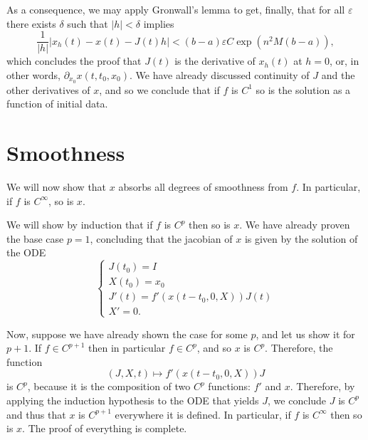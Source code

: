 \documentclass{article}
\begin{document}
As a consequence, we may apply Gronwall's lemma to get, finally, that for all $\varepsilon$ there exists $\delta$ such that $\lvert h \rvert < \delta$ implies
\[ \frac1{\lvert h \rvert} \lvert x_h(t) - x(t) - J(t) h \rvert < (b-a)\varepsilon C \exp(n^2 M (b-a)),\]
which concludes the proof that $J(t)$ is the derivative of $x_h(t)$ at $h=0$, or, in other words, $\partial_{x_0} x(t,t_0,x_0)$. We have already discussed continuity of $J$ and the other derivatives of $x$, and so we conclude that if $f$ is $C^1$ so is the solution as a function of initial data.

\section{Smoothness}

We will now show that $x$ absorbs all degrees of smoothness from $f$. In particular, if $f$ is $C^\infty$, so is $x$.

We will show by induction that if $f$ is $C^p$ then so is $x$. We have already proven the base case $p = 1$, concluding that the jacobian of $x$ is given by the solution of the ODE
\[
\begin{cases}
J(t_0) = I\\
X(t_0) = x_0\\
J'(t) = f'(x(t-t_0,0,X)) J(t)\\
X' = 0.
\end{cases}
\]

Now, suppose we have already shown the case for some $p$, and let us show it for $p+1$. If $f \in C^{p+1}$ then in particular $f \in C^p$, and so $x$ is $C^p$. Therefore, the function
\[(J,X,t) \mapsto f'(x(t-t_0,0,X)) J\]
is $C^p$, because it is the composition of two $C^p$ functions: $f'$ and $x$. Therefore, by applying the induction hypothesis to the ODE that yields $J$, we conclude $J$ is $C^p$ and thus that $x$ is $C^{p+1}$ everywhere it is defined. In particular, if $f$ is $C^\infty$ then so is $x$. The proof of everything is complete.
\end{document}

